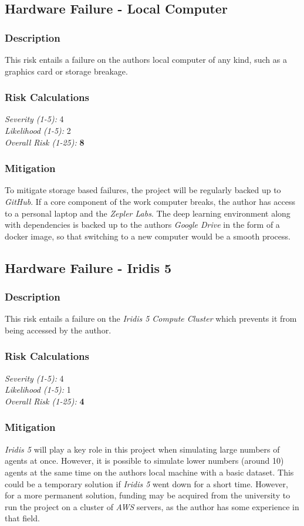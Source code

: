 \subsection{Hardware Failure - Local Computer}
\subsubsection{Description}
This risk entails a failure on the authors local computer of any kind, such as a graphics card or storage breakage.

\subsubsection{Risk Calculations}
\emph{Severity (1-5):} 4 \\
\emph{Likelihood (1-5):} 2 \\
\emph{Overall Risk (1-25):} \textbf{8}

\subsubsection{Mitigation}
To mitigate storage based failures, the project will be regularly backed up to \emph{GitHub}. If a core component of the work computer breaks, the author has access to a personal laptop and the \emph{Zepler Labs}. The deep learning environment along with dependencies is backed up to the authors \emph{Google Drive} in the form of a docker image, so that switching to a new computer would be a smooth process.

\subsection{Hardware Failure - Iridis 5}
\subsubsection{Description}
This risk entails a failure on the \emph{Iridis 5 Compute Cluster} which prevents it from being accessed by the author.

\subsubsection{Risk Calculations}
\emph{Severity (1-5):} 4 \\
\emph{Likelihood (1-5):} 1 \\
\emph{Overall Risk (1-25):} \textbf{4}

\subsubsection{Mitigation}
\emph{Iridis 5} will play a key role in this project when simulating large numbers of agents at once. However, it is possible to simulate lower numbers (around 10) agents at the same time on the authors local machine with a basic dataset. This could be a temporary solution if \emph{Iridis 5} went down for a short time. However, for a more permanent solution, funding may be acquired from the university to run the project on a cluster of \emph{AWS} servers, as the author has some experience in that field. 

